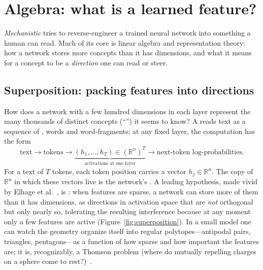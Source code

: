 \section{Algebra: what is a learned feature?}
\label{sec:interp}

\emph{Mechanistic } tries to reverse-engineer a trained neural network into something a human can read. Much of its core is linear algebra and representation theory: how a network stores more concepts than it has dimensions, and what it means for a concept to be a \emph{direction} one can read or steer.

\subsection{Superposition: packing features into directions}

How does a network with a few hundred dimensions in each layer represent
the many thousands of distinct concepts (``'')
it seems to know?
A  reads text as a sequence of
, words and word-fragments; at any fixed layer,
the computation has the form
\[
\text{text}
\longrightarrow
\text{tokens}
\longrightarrow
\underbrace{(h_1,\ldots,h_T)\in(\mathbb{R}^n)^T}
            _{\text{activations at one layer}}
\longrightarrow
\text{next-token log-probabilities}.
\]
For a text of $T$ tokens, each token position carries a vector
$h_j\in\mathbb{R}^n$.
The copy of $\mathbb{R}^n$ in which these vectors live is the network's
.
A leading hypothesis, made vivid by Elhage et al.~\cite{elhage2022},
is : when features are sparse,
a network can store more of them than it has dimensions, as directions in
activation space that are \emph{not} orthogonal but only nearly so,
tolerating the resulting interference because at any moment only a few
features are active (Figure~\ref{fig:superposition}).
In a small  model one can watch the geometry organize
itself into regular polytopes---antipodal pairs, triangles, pentagons---as
a function of how sparse and how important the features are; it is,
recognizably, a Thomson problem (where do mutually repelling charges
on a sphere come to rest?)~\cite{saff1997}.

